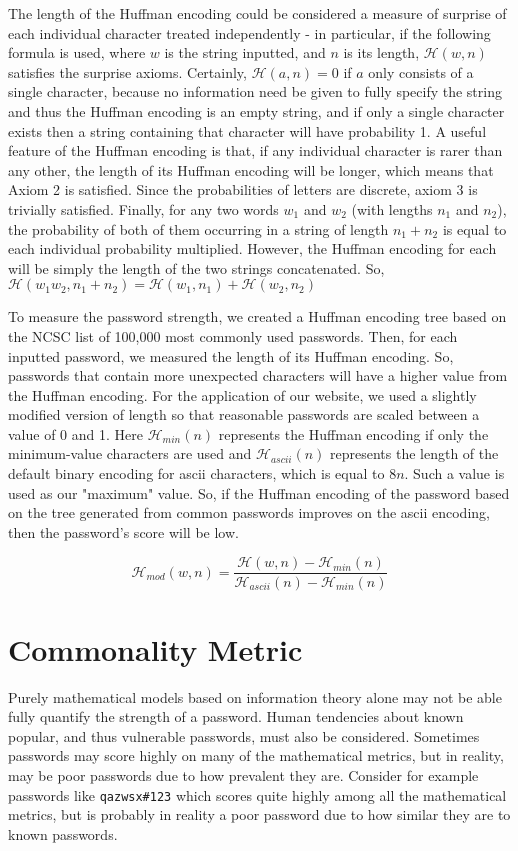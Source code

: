 \documentclass{article}
\begin{document}
The length of the Huffman encoding could be considered a measure of surprise of each individual character treated independently - in particular, if the following formula is used, where $w$ is the string inputted, and $n$ is its length, $\mathcal{H}(w,n)$ satisfies the surprise axioms. Certainly, $\mathcal{H}(a,n)=0$ if $a$ only consists of a single character, because no information need be given to fully specify the string and thus the Huffman encoding is an empty string, and if only a single character exists then a string containing that character will have probability 1. A useful feature of the Huffman encoding is that, if any individual character is rarer than any other, the length of its Huffman encoding will be longer, which means that Axiom 2 is satisfied. Since the probabilities of letters are discrete, axiom 3 is trivially satisfied. Finally, for any two words $w_1$ and $w_2$ (with lengths $n_1$ and $n_2$), the probability of both of them occurring in a string of length $n_1+n_2$ is equal to each individual probability multiplied. However, the Huffman encoding for each will be simply the length of the two strings concatenated. So, $\mathcal{H}(w_1w_2,n_1+n_2)=\mathcal{H}(w_1,n_1)+\mathcal{H}(w_2,n_2)$

To measure the password strength, we created a Huffman encoding tree based on the NCSC list of 100,000 most commonly used passwords. Then, for each inputted password, we measured the length of its Huffman encoding. So, passwords that contain more unexpected characters will have a higher value from the Huffman encoding.
For the application of our website, we used a slightly modified version of length so that reasonable passwords are scaled between a value of 0 and 1. Here $\mathcal{H}_{min}(n)$ represents the Huffman encoding if only the minimum-value characters are used and $\mathcal{H}_{ascii}(n)$ represents the length of the default binary encoding for ascii characters, which is equal to $8n$. Such a value is used as our "maximum" value. So, if the Huffman encoding of the password based on the tree generated from common passwords improves on the ascii encoding, then the password's score will be low.

\[\mathcal{H}_{mod}(w,n)=\frac{\mathcal{H}(w,n)-\mathcal{H}_{min}(n)}{\mathcal{H}_{ascii}(n)-\mathcal{H}_{min}(n)}\]

\section{Commonality Metric}
Purely mathematical models based on information theory alone may not be able fully quantify the strength of a password. Human tendencies about known popular, and thus vulnerable passwords, must also be considered. Sometimes passwords may score highly on many of the mathematical metrics, but in reality, may be poor passwords due to how prevalent they are. Consider for example passwords like 
\verb!qazwsx#123!
which scores quite highly among all the mathematical metrics, but is probably in reality a poor password due to how similar they are to known passwords.
\end{document}
